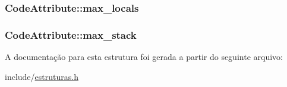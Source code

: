 \subsubsection[{\texorpdfstring{max\+\_\+locals}{max_locals}}]{ Code\+Attribute\+::max\+\_\+locals}\hypertarget{struct_code_attribute_a1407b9bddee5eca9e0b0b20fbf1a8f1f}{}\label{struct_code_attribute_a1407b9bddee5eca9e0b0b20fbf1a8f1f}
\subsubsection[{\texorpdfstring{max\+\_\+stack}{max_stack}}]{ Code\+Attribute\+::max\+\_\+stack}\hypertarget{struct_code_attribute_a61e8f2685ef2bb170d72e402a0e72ca2}{}\label{struct_code_attribute_a61e8f2685ef2bb170d72e402a0e72ca2}


A documentação para esta estrutura foi gerada a partir do seguinte arquivo\+:\begin{DoxyCompactItemize}
\item 
include/\hyperlink{estruturas_8h}{estruturas.\+h}\end{DoxyCompactItemize}
